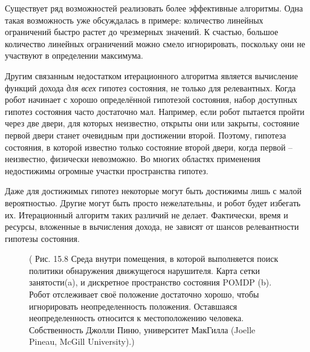 \documentclass[10pt,a4paper]{article}
\begin{document}
Существует ряд возможностей реализовать более эффективные алгоритмы. Одна такая возможность уже обсуждалась в примере: количество линейных ограничений быстро растет до чрезмерных значений. К счастью, большое количество линейных ограничений можно смело игнорировать, поскольку они не участвуют в определении максимума.

Другим связанным недостатком  итерационного алгоритма является вычисление функций дохода \textit{для всех} гипотез состояния, не только для релевантных. Когда робот начинает с хорошо определённой гипотезой состояния, набор доступных гипотез состояния часто достаточно мал. Например, если робот пытается пройти через две двери, для которых неизвестно, открыты они или закрыты, состояние первой двери станет очевидным при достижении второй. Поэтому, гипотеза состояния, в которой известно только состояние второй двери, когда первой – неизвестно, физически невозможно. Во многих областях применения недостижимы огромные участки пространства гипотез.

Даже для достижимых гипотез некоторые могут быть достижимы лишь с малой вероятностью. Другие могут быть просто нежелательны, и робот будет избегать их. Итерационный алгоритм таких различий не делает. Фактически, время и ресурсы, вложенные в вычисления дохода, не зависят от шансов релевантности гипотезы состояния.

\begin{figure}[H]
	\caption{ ( Рис. 15.8 Среда внутри помещения, в которой выполняется поиск политики обнаружения движущегося нарушителя.  Карта сетки занятости(a), и  дискретное пространство состояния POMDP (b). Робот отслеживает своё положение достаточно хорошо, чтобы игнорировать неопределенность положения. Оставшаяся неопределенность относится к местоположению человека. Собственность Джолли Пиню, университет МакГилла (Joelle Pineau, McGill University).) }
	\label{fig:158orig}
\end{figure}
\end{document}
